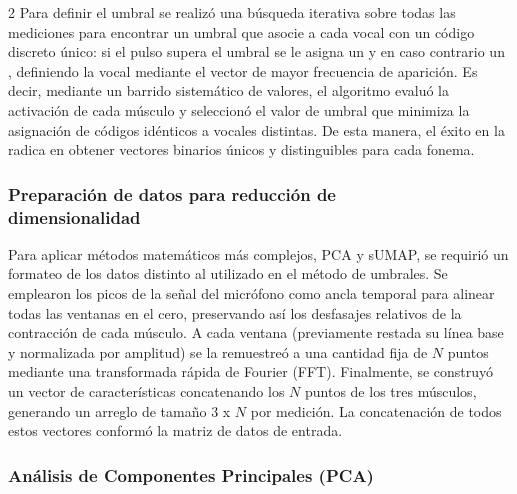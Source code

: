 \documentclass[11pt, letterpaper]{article}
\begin{document}
\begin{multicols*}{2}
Para definir el umbral se realizó una búsqueda iterativa sobre todas las mediciones para encontrar un umbral que asocie a cada vocal con un código discreto único: si el pulso supera el umbral se le asigna un  y en caso contrario un , definiendo la vocal mediante el vector de mayor frecuencia de aparición. Es decir, mediante un barrido sistemático de valores, el algoritmo evaluó la activación de cada músculo y seleccionó el valor de umbral que minimiza la asignación de códigos idénticos a vocales distintas. De esta manera, el éxito en la  radica en obtener vectores binarios únicos y distinguibles para cada fonema.

\subsubsection*{Preparación de datos para reducción de\\dimensionalidad}

Para aplicar métodos matemáticos más complejos, PCA y sUMAP, se requirió un formateo de los datos distinto al utilizado en el método de umbrales. Se emplearon los picos de la señal del micrófono como ancla temporal para alinear todas las ventanas en el cero, preservando así los desfasajes relativos de la contracción de cada músculo. A cada ventana (previamente restada su línea base y normalizada por amplitud) se la remuestreó a una cantidad fija de $N$ puntos mediante una transformada rápida de Fourier (FFT). Finalmente, se construyó un vector de características concatenando los $N$ puntos de los tres músculos, generando un arreglo de tamaño $3$ x $N$ por medición. La concatenación de todos estos vectores conformó la matriz de datos de entrada.


\subsubsection*{Análisis de Componentes Principales (PCA)}
  

\end{multicols*}
\end{document}
